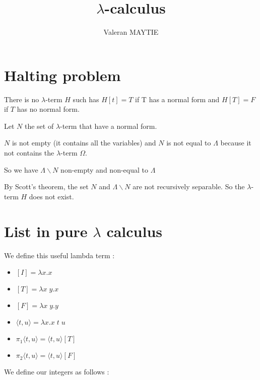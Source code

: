 \documentclass{article}
\date{}
\title{$\lambda$-calculus}
\author{Valeran MAYTIE}
\theoremstyle{plain}
\begin{document}
  \maketitle

  \section*{Halting problem}

  \begin{center}
    There is no $\lambda$-term $H$ such has $H[t] = T$ if T has a normal
    form and $H[T] = F$ if $T$ has no normal form.
  \end{center}

  Let $N$ the set of $\lambda$-term that have a normal form.

  $N$ is not empty (it contains all the variables) and $N$ is not equal to
  $\Lambda$ because it not contains the $\lambda$-term $\Omega$.

  So we have $\Lambda \backslash N$ non-empty and non-equal to $\Lambda$

  By Scott's theorem, the set $N$ and $\Lambda \backslash N$ are not recursively
  separable. So the $\lambda$-term $H$ does not exist.

  \section*{List in pure $\lambda$ calculus}

  We define this useful lambda term :

  \begin{multicols}{2}
    \begin{itemize}
      \item $[I] = \lambda x.x$
      \item $[T] = \lambda x\;y.x$
      \item $[F] = \lambda x\;y.y$
    \end{itemize}
    \columnbreak
    \begin{itemize}
      \item $\langle t, u \rangle = \lambda x. x\;t\;u$
      \item $\pi_1 \langle t, u \rangle = \langle t, u \rangle [T]$
      \item $\pi_2 \langle t, u \rangle = \langle t, u \rangle [F]$
    \end{itemize}
  \end{multicols}

  We define our integers as follows :
\end{document}
